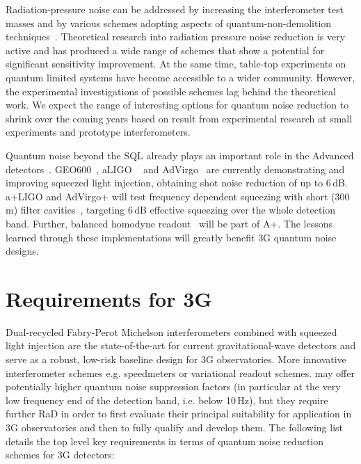 Radiation-pressure noise can be addressed by increasing the interferometer test masses and by various schemes adopting aspects of quantum-non-demolition techniques~\cite{KLMTV2001,PuCh2002,Che2003,Braginsky:2004fp}. Theoretical research into radiation pressure noise reduction is very active and has produced a wide range of schemes that show a potential for significant sensitivity improvement. At the same time, table-top experiments on quantum limited systems have become accessible to a wider community. However, the experimental investigations of possible schemes lag behind the theoretical work. We expect the range of interesting options for quantum noise reduction to shrink over the coming years based on result from experimental research at small experiments and prototype interferometers.

Quantum noise beyond the  \ac{SQL}    already plays an important role in the Advanced detectors~\cite{BuCh2001}. GEO600~\cite{GEO:Squeezing}, \Ac{aLIGO}  ~\cite{H1:Squeezing,AdvancedLIGO2015} and \ac{AdVirgo}~\cite{AdvancedVirgo2015} are currently demonstrating and improving squeezed light injection, obtaining shot noise reduction of up to 6\,dB. \ac{a+LIGO} and \ac{AdVirgo+} will test frequency dependent squeezing with short (300\,m) filter cavities~\cite{Eva2013,TAMA_FDS2016}, targeting 6\,dB effective squeezing over the whole detection band. Further, balanced homodyne readout~\cite{BHD,Stefszky:Balanced2012} will be part of A+. The lessons learned through these implementations will greatly benefit  \ac{3G}   quantum noise designs.

\section{Requirements for  \ac{3G}  }
Dual-recycled Fabry-Perot Michelson interferometers combined with squeezed light injection are the state-of-the-art for current gravitational-wave detectors and serve as a robust, low-risk baseline design for  \ac{3G}   observatories. More innovative interferometer schemes e.g. speedmeters or variational readout schemes.
may offer potentially higher quantum noise suppression factors (in particular at the very low frequency end of the detection band, i.e. below 10\,Hz),  but they require further  \ac{RaD}   
 in order to first evaluate their principal suitability for application in  \ac{3G}   observatories and then to fully qualify and develop them. 
The following list details the top level  key requirements in terms of quantum noise reduction schemes   for  \ac{3G}   detectors:


